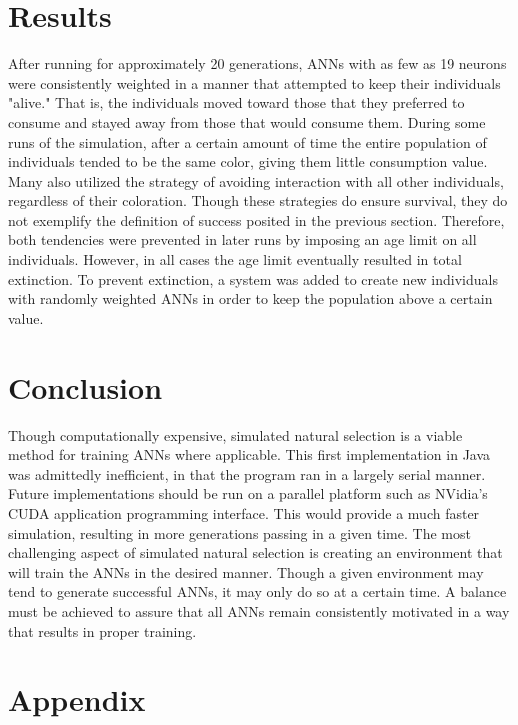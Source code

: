 \documentclass[12pt]{article} %
\newcommand\tab[1][1cm]{\hspace*{#1}} %
\begin{document}
\section{Results}
After running for approximately 20 generations, ANNs with as few as 19 neurons were consistently weighted in a manner that attempted to keep their individuals "alive."  That is, the individuals moved toward those that they preferred to consume and stayed away from those that would consume them.  
\newline
\tab During some runs of the simulation, after a certain amount of time the entire population of individuals tended to be the same color, giving them little consumption value.  Many also utilized the strategy of avoiding interaction with all other individuals, regardless of their coloration.  Though these strategies do ensure survival, they do not exemplify the definition of success posited in the previous section.  Therefore, both tendencies were prevented in later runs by imposing an age limit on all individuals.  However, in all cases the age limit eventually resulted in total extinction.  To prevent extinction, a system was added to create new individuals with randomly weighted ANNs in order to keep the population above a certain value.


\section{Conclusion}
Though computationally expensive, simulated natural selection is a viable method for training ANNs where applicable.  This first implementation in Java was admittedly inefficient, in that the program ran in a largely serial manner.  Future implementations should be run on a parallel platform such as NVidia’s CUDA application programming interface.  This would provide a much faster simulation, resulting in more generations passing in a given time.
\newline
\tab The most challenging aspect of simulated natural selection is creating an environment that will train the ANNs in the desired manner.  Though a given environment may tend to generate successful ANNs, it may only do so at a certain time.  A balance must be achieved to assure that all ANNs remain consistently motivated in a way that results in proper training.

\newpage

\section{Appendix}
\end{document}
